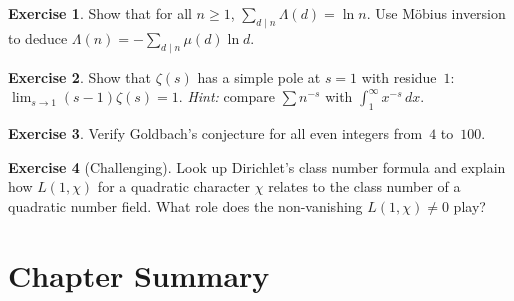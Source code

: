 \documentclass[12pt,a4paper,openany]{book}
\theoremstyle{definition}
\newtheorem{exercise}{Exercise}[chapter]
\theoremstyle{plain}
\theoremstyle{remark}
\begin{document}
\begin{exercise}
\label{exer:von-mangoldt}
Show that for all $n \geq 1$, $\sum_{d \mid n}\Lambda(d) = \ln n$.
Use Möbius inversion to deduce $\Lambda(n) = -\sum_{d\mid n}\mu(d)\ln d$.
\end{exercise}

\begin{exercise}
\label{exer:zeta-1-nonzero}
Show that $\zeta(s)$ has a simple pole at $s=1$ with residue~$1$:
$\lim_{s\to 1}(s-1)\zeta(s) = 1$. \emph{Hint:} compare $\sum n^{-s}$ with
$\int_1^\infty x^{-s}\,dx$.
\end{exercise}

\begin{exercise}
\label{exer:goldbach-verify}
Verify Goldbach's conjecture for all even integers from~$4$ to~$100$.
\end{exercise}

\begin{exercise}[Challenging]
\label{exer:dirichlet-class-number}
Look up Dirichlet's class number formula and explain how $L(1,\chi)$ for a
quadratic character $\chi$ relates to the class number of a quadratic number
field. What role does the non-vanishing $L(1,\chi) \neq 0$ play?
\end{exercise}

\section{Chapter Summary}
\label{sec:analytic-summary}
\end{document}
